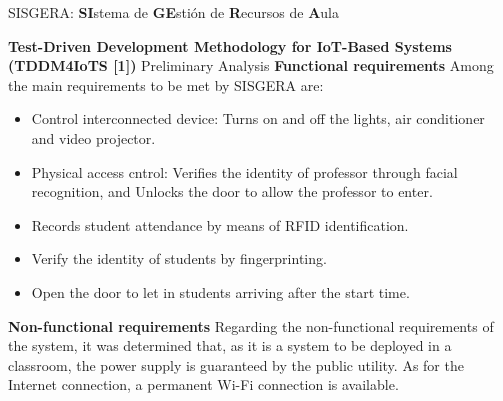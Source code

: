 \documentclass[notes=show, 10pt]{beamer}
\begin{document}
    \begin{frame}{SISGERA: \textbf{SI}stema de \textbf{GE}stión de \textbf{R}ecursos de \textbf{A}ula}
        \begin{block} {}
            
        \textbf{Test-Driven Development Methodology for IoT-Based Systems (TDDM4IoTS [1])}
            Preliminary Analysis
            \textbf{Functional requirements}
            Among the main requirements to be met by SISGERA are:
            \begin{itemize}
                \item Control interconnected device: Turns on and off the lights, air conditioner and video projector.
                \item Physical access cntrol: Verifies the identity of professor through facial recognition, and Unlocks the door to allow the professor to enter.
                \item Records student attendance by means of RFID identification.
                \item Verify the identity of students by fingerprinting.
                \item Open the door to let in students arriving after the start time.
            \end{itemize}
            \textbf{Non-functional requirements}
            Regarding the non-functional requirements of the system, it was determined that, as it is a system to be deployed in a classroom, the power supply is guaranteed by the public utility. As for the Internet connection, a permanent Wi-Fi connection is available.
        \end{block}
    \end{frame}
        
\end{document}
